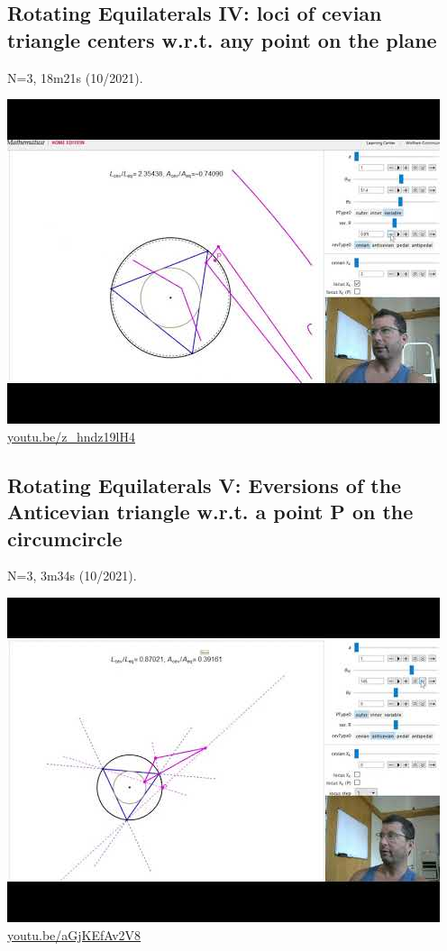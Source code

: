 \documentclass[12pt]{amsart}
\begin{document}
\subsection{Rotating Equilaterals IV: loci of cevian triangle centers w.r.t. any point on the plane}
\label{vid:z_hndz19lH4}
\noindent N=3, 18m21s (10/2021). 
\begin{center}\includegraphics[width=.5\textwidth]{pics/z_hndz19lH4.jpg} \\ 
\href{https://youtu.be/z_hndz19lH4}{\url{youtu.be/z\_hndz19lH4}}\end{center}
% 

\subsection{Rotating Equilaterals V: Eversions of the Anticevian triangle w.r.t. a point P on the circumcircle}
\label{vid:aGjKEfAv2V8}
\noindent N=3, 3m34s (10/2021). 
\begin{center}\includegraphics[width=.5\textwidth]{pics/aGjKEfAv2V8.jpg} \\ 
\href{https://youtu.be/aGjKEfAv2V8}{\url{youtu.be/aGjKEfAv2V8}}\end{center}
% 
\end{document}
